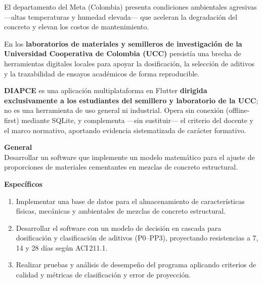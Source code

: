 \documentclass[10pt]{article}
\begin{document}
\noindent
\begin{minipage}[t]{0.2425\textwidth}

  \begin{tcolorbox}[posterbox, title=Introducción]
    \small
    El departamento del Meta (Colombia) presenta condiciones ambientales
    agresivas —altas temperaturas y humedad elevada— que aceleran la degradación
    del concreto y elevan los costos de mantenimiento.

    En los \textbf{laboratorios de materiales y semilleros de investigación de
    la Universidad Cooperativa de Colombia (UCC)} persistía una brecha de
    herramientas digitales locales para apoyar la dosificación, la selección de
    aditivos y la trazabilidad de ensayos académicos de forma reproducible.

    \textbf{DIAPCE} es una aplicación multiplataforma en Flutter
    \textbf{dirigida exclusivamente a los estudiantes del semillero y laboratorio
    de la UCC}; no es una herramienta de uso general ni industrial. Opera sin
    conexión (offline-first) mediante SQLite, y complementa —sin sustituir— el
    criterio del docente y el marco normativo, aportando evidencia sistematizada
    de carácter formativo.
  \end{tcolorbox}

  \begin{tcolorbox}[posterbox, title=Objetivos]
    \small
    \textbf{General}\\
    Desarrollar un software que implemente un modelo matemático para el ajuste
    de proporciones de materiales cementantes en mezclas de concreto estructural.

    \vspace{2pt}
    \textbf{Específicos}
    \begin{enumerate}[leftmargin=14pt, topsep=1pt, itemsep=1pt]
      \item Implementar una base de datos para el almacenamiento de
            características físicas, mecánicas y ambientales de mezclas de
            concreto estructural.
      \item Desarrollar el software con un modelo de decisión en cascada para
            dosificación y clasificación de aditivos (P0–PP3), proyectando
            resistencias a 7, 14 y 28 días según ACI\,211.1.
      \item Realizar pruebas y análisis de desempeño del programa aplicando
            criterios de calidad y métricas de clasificación y error de
            proyección.
    \end{enumerate}
  \end{tcolorbox}

\end{minipage}
\end{document}
